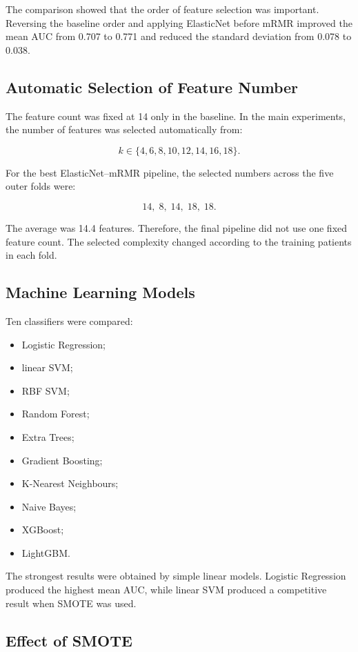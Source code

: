 \documentclass[10pt,a4paper]{article}
\begin{document}
The comparison showed that the order of feature selection was important. Reversing the baseline order and applying ElasticNet before mRMR improved the mean AUC from 0.707 to 0.771 and reduced the standard deviation from 0.078 to 0.038.

\subsection{Automatic Selection of Feature Number}

The feature count was fixed at 14 only in the baseline. In the main experiments, the number of features was selected automatically from:

\[
k \in \{4,6,8,10,12,14,16,18\}.
\]

For the best ElasticNet--mRMR pipeline, the selected numbers across the five outer folds were:

\[
14,\;8,\;14,\;18,\;18.
\]

The average was 14.4 features. Therefore, the final pipeline did not use one fixed feature count. The selected complexity changed according to the training patients in each fold.

\subsection{Machine Learning Models}

Ten classifiers were compared:

\begin{itemize}[leftmargin=1.5em]
    \item Logistic Regression;
    \item linear SVM;
    \item RBF SVM;
    \item Random Forest;
    \item Extra Trees;
    \item Gradient Boosting;
    \item K-Nearest Neighbours;
    \item Naive Bayes;
    \item XGBoost;
    \item LightGBM.
\end{itemize}

The strongest results were obtained by simple linear models. Logistic Regression produced the highest mean AUC, while linear SVM produced a competitive result when SMOTE was used.


\subsection{Effect of SMOTE}
\end{document}
